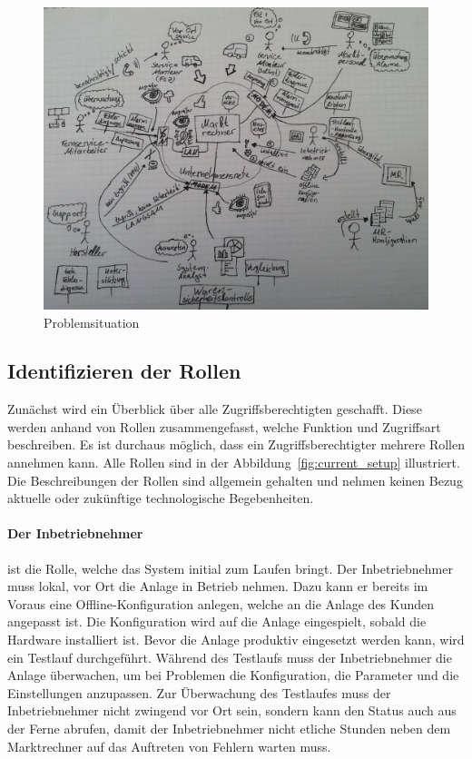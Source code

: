 \documentclass[11pt,a4paper]{report}
\begin{document}
\begin{figure}[h]
\centering
\includegraphics[scale=0.215]{images/problemsituation.jpg}
\caption{Problemsituation}
\label{fig:problem_situation}
\end{figure}

\subsection{Identifizieren der Rollen} \label{sec:roles}

Zunächst wird ein Überblick über alle Zugriffsberechtigten geschafft. Diese werden anhand von Rollen zusammengefasst, welche Funktion und Zugriffsart beschreiben. Es ist durchaus möglich, dass ein Zugriffsberechtigter mehrere Rollen annehmen kann. Alle Rollen sind in der Abbildung~\ref{fig:current_setup} illustriert. Die Beschreibungen der Rollen sind allgemein gehalten und nehmen keinen Bezug aktuelle oder zukünftige technologische Begebenheiten.

\paragraph{Der Inbetriebnehmer} ist die Rolle, welche das System initial zum Laufen bringt. Der Inbetriebnehmer muss lokal, vor Ort die Anlage in Betrieb nehmen. Dazu kann er bereits im Voraus eine Offline-Konfiguration anlegen, welche an die Anlage des Kunden angepasst ist. Die Konfiguration wird auf die Anlage eingespielt, sobald die Hardware installiert ist. Bevor die Anlage produktiv eingesetzt werden kann, wird ein Testlauf durchgeführt. Während des Testlaufs muss der Inbetriebnehmer die Anlage überwachen, um bei Problemen die Konfiguration, die Parameter und die Einstellungen anzupassen. Zur Überwachung des Testlaufes muss der Inbetriebnehmer nicht zwingend vor Ort sein, sondern kann den Status auch aus der Ferne abrufen, damit der Inbetriebnehmer nicht etliche Stunden neben dem Marktrechner auf das Auftreten von Fehlern warten muss.
\end{document}
